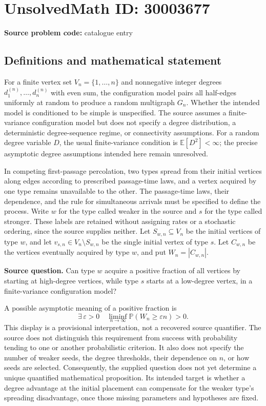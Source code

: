 \documentclass[11pt]{article}
\newcommand{\E}{\mathbb{E}}
\begin{document}
\section*{UnsolvedMath ID: 30003677}
\textbf{Source problem code:} catalogue entry
\subsection{Definitions and mathematical statement}
For a finite vertex set \(V_n=\{1,\ldots,n\}\) and nonnegative integer degrees \(d_1^{(n)},\ldots,d_n^{(n)}\) with even sum, the configuration model pairs all half-edges uniformly at random to produce a random multigraph \(G_n\). Whether the intended model is conditioned to be simple is unspecified. The source assumes a finite-variance configuration model but does not specify a degree distribution, a deterministic degree-sequence regime, or connectivity assumptions. For a random degree variable \(D\), the usual finite-variance condition is \(\E[D^2]<\infty\); the precise asymptotic degree assumptions intended here remain unresolved.

In competing first-passage percolation, two types spread from their initial vertices along edges according to prescribed passage-time laws, and a vertex acquired by one type remains unavailable to the other. The passage-time laws, their dependence, and the rule for simultaneous arrivals must be specified to define the process. Write \(w\) for the type called weaker in the source and \(s\) for the type called stronger. These labels are retained without assigning rates or a stochastic ordering, since the source supplies neither. Let \(S_{w,n}\subseteq V_n\) be the initial vertices of type \(w\), and let \(v_{s,n}\in V_n\setminus S_{w,n}\) be the single initial vertex of type \(s\). Let \(C_{w,n}\) be the vertices eventually acquired by type \(w\), and put \(W_n=|C_{w,n}|\).

\textbf{Source question.} Can type \(w\) acquire a positive fraction of all vertices by starting at high-degree vertices, while type \(s\) starts at a low-degree vertex, in a finite-variance configuration model?

A possible asymptotic meaning of a positive fraction is
\[
\exists\,\varepsilon>0\quad
\liminf_{n\to\infty}\mathbb{P}(W_n\geq \varepsilon n)>0.
\]
This display is a provisional interpretation, not a recovered source quantifier. The source does not distinguish this requirement from success with probability tending to one or another probabilistic criterion. It also does not specify the number of weaker seeds, the degree thresholds, their dependence on \(n\), or how seeds are selected. Consequently, the supplied question does not yet determine a unique quantified mathematical proposition. Its intended target is whether a degree advantage at the initial placement can compensate for the weaker type's spreading disadvantage, once those missing parameters and hypotheses are fixed.
\end{document}
